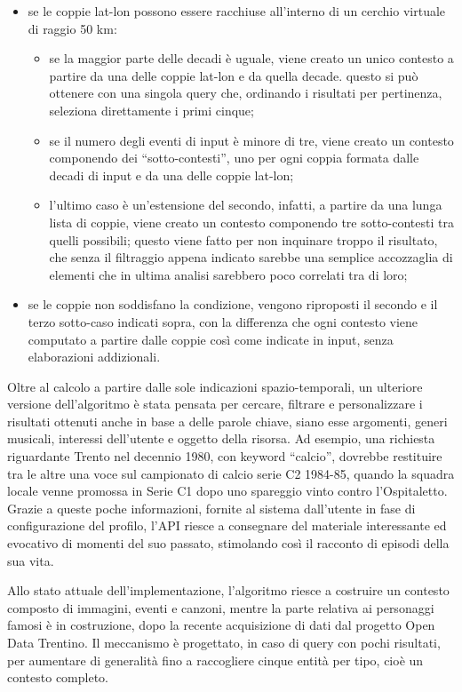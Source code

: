 \documentclass[sigproc-sp.tex]{subfiles}
\begin{document}
\begin{itemize}
\item se le coppie lat-lon possono essere racchiuse all’interno di un cerchio virtuale di raggio 50 km:
\begin{itemize}
\item se la maggior parte delle decadi è uguale, viene creato un unico contesto a partire da una delle coppie lat-lon e da quella decade. questo si può ottenere con una singola query che, ordinando i risultati per pertinenza, seleziona direttamente i primi cinque;
\item se il numero degli eventi di input è minore di tre, viene creato un contesto componendo dei “sotto-contesti”, uno per ogni coppia formata dalle decadi di input e da una delle coppie lat-lon;
\item l’ultimo caso è un’estensione del secondo, infatti, a partire da una lunga lista di coppie, viene creato un contesto componendo tre sotto-contesti tra quelli possibili; questo viene fatto per non inquinare troppo il risultato, che senza il filtraggio appena indicato sarebbe una semplice accozzaglia di elementi che in ultima analisi sarebbero poco correlati tra di loro;
\end{itemize}
\item se le coppie non soddisfano la condizione, vengono riproposti il secondo e il terzo sotto-caso indicati sopra, con la differenza che ogni contesto viene computato a partire dalle coppie così come indicate in input, senza elaborazioni addizionali.
\end{itemize}

Oltre al calcolo a partire dalle sole indicazioni spazio-temporali, un ulteriore versione dell’algoritmo è stata pensata per cercare, filtrare e personalizzare i risultati ottenuti anche in base a delle parole chiave, siano esse argomenti, generi musicali, interessi dell’utente e oggetto della risorsa. Ad esempio, una richiesta riguardante Trento nel decennio 1980, con keyword “calcio”, dovrebbe restituire tra le altre una voce sul campionato di calcio serie C2 1984-85, quando la squadra locale venne promossa in Serie C1 dopo uno spareggio vinto contro l'Ospitaletto.
Grazie a queste poche informazioni, fornite al sistema dall’utente in fase di configurazione del profilo, l’API riesce a consegnare del materiale interessante ed evocativo di momenti del suo passato, stimolando così il racconto di episodi della sua vita.

Allo stato attuale dell'implementazione, l'algoritmo riesce a costruire un contesto composto di immagini, eventi e canzoni, mentre la parte relativa ai personaggi famosi è in costruzione, dopo la recente acquisizione di dati dal progetto Open Data Trentino. Il meccanismo è progettato, in caso di query con pochi risultati, per aumentare di generalità fino a raccogliere cinque entità per tipo, cioè un contesto completo.
\end{document}
